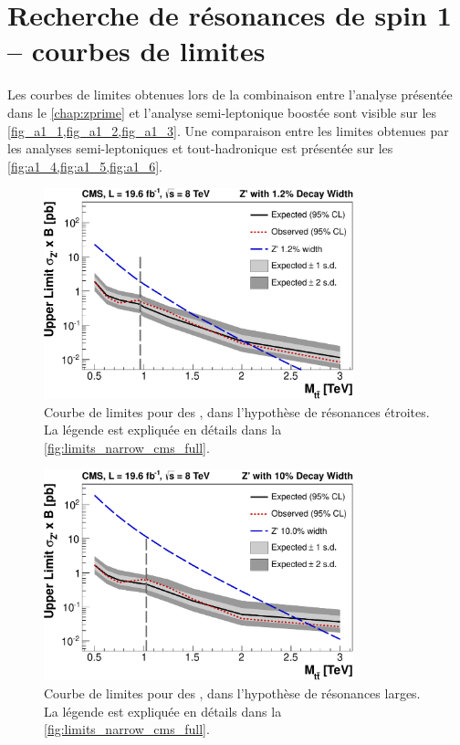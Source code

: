 \chapter{Recherche de résonances de spin 1 -- courbes de limites}

Les courbes de limites obtenues lors de la combinaison entre l'analyse présentée dans le \cref{chap:zprime} et l'analyse semi-leptonique boostée sont visible sur les \cref{fig_a1_1,fig_a1_2,fig_a1_3}. Une comparaison entre les limites obtenues par les analyses semi-leptoniques et tout-hadronique est présentée sur les \cref{fig:a1_4,fig:a1_5,fig:a1_6}.

\begin{figure}[tb]
    \centering
    \includegraphics[width=0.8\textwidth]{chapitre7/figs/limits-narrow.pdf}
    \caption{Courbe de limites pour des \zprime, dans l'hypothèse de résonances étroites. La légende est expliquée en détails dans la \cref{fig:limits_narrow_cms_full}.}
    \label{fig_a1_1}
\end{figure}

\begin{figure}[tb]
    \centering
    \includegraphics[width=0.8\textwidth]{chapitre7/figs/limits-wide.pdf}
    \caption{Courbe de limites pour des \zprime, dans l'hypothèse de résonances larges. La légende est expliquée en détails dans la \cref{fig:limits_narrow_cms_full}.}
    \label{fig_a1_2}
\end{figure}


